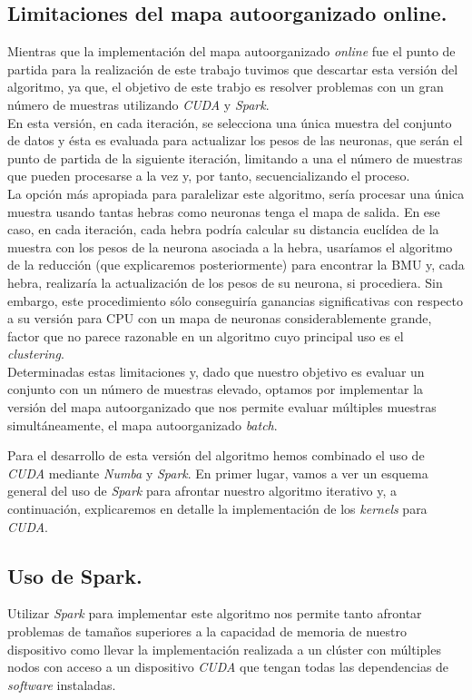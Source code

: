 \subsection{Limitaciones del mapa autoorganizado online.}
Mientras que la implementación del mapa autoorganizado \textit{online} fue el punto de partida para la realización de este trabajo tuvimos que descartar esta versión del algoritmo, ya que, el objetivo de este trabjo es resolver problemas con un gran número de muestras utilizando \textit{CUDA} y \textit{Spark}.\\

En esta versión, en cada iteración, se selecciona una única muestra del conjunto de datos y ésta es evaluada para actualizar los pesos de las neuronas, que serán el punto de partida de la siguiente iteración, limitando a una el número de muestras que pueden procesarse a la vez y, por tanto, secuencializando el proceso.\\

La opción más apropiada para paralelizar este algoritmo, sería procesar una única muestra usando tantas hebras como neuronas tenga el mapa de salida. En ese caso, en cada iteración, cada hebra podría calcular su distancia euclídea de la muestra con los pesos de la neurona asociada a la hebra, usaríamos el algoritmo de la reducción (que explicaremos posteriormente) para encontrar la BMU y, cada hebra, realizaría la actualización de los pesos de su neurona, si procediera. Sin embargo, este procedimiento sólo conseguiría ganancias significativas con respecto a su versión para CPU con un mapa de neuronas considerablemente grande, factor que no parece razonable en un algoritmo cuyo principal uso es el \textit{clustering}.\\

Determinadas estas limitaciones y, dado que nuestro objetivo es evaluar un conjunto con un número de muestras elevado, optamos por implementar la versión del mapa autoorganizado que nos permite evaluar múltiples muestras simultáneamente, el mapa autoorganizado \textit{batch}.

Para el desarrollo de esta versión del algoritmo hemos combinado el uso de \textit{CUDA} mediante \textit{Numba} y \textit{Spark}. En primer lugar, vamos a ver un esquema general del uso de \textit{Spark} para afrontar nuestro algoritmo iterativo y, a continuación, explicaremos en detalle la implementación de los \textit{kernels} para \textit{CUDA}.

\subsection{Uso de Spark.}
Utilizar \textit{Spark} para implementar este algoritmo nos permite tanto afrontar problemas de tamaños superiores a la capacidad de memoria de nuestro dispositivo como llevar la implementación realizada a un clúster con múltiples nodos con acceso a un dispositivo \textit{CUDA} que tengan todas las dependencias de \textit{software} instaladas.\\

